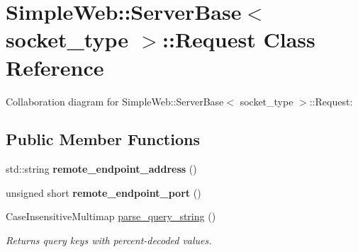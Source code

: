 \hypertarget{classSimpleWeb_1_1ServerBase_1_1Request}{}\section{Simple\+Web\+:\+:Server\+Base$<$ socket\+\_\+type $>$\+:\+:Request Class Reference}
\label{classSimpleWeb_1_1ServerBase_1_1Request}


Collaboration diagram for Simple\+Web\+:\+:Server\+Base$<$ socket\+\_\+type $>$\+:\+:Request\+:
\subsection*{Public Member Functions}
\begin{DoxyCompactItemize}
\item 
std\+::string {\bfseries remote\+\_\+endpoint\+\_\+address} ()\hypertarget{classSimpleWeb_1_1ServerBase_1_1Request_a0a6fbd6d33f7914fb1210505b4d49636}{}\label{classSimpleWeb_1_1ServerBase_1_1Request_a0a6fbd6d33f7914fb1210505b4d49636}

\item 
unsigned short {\bfseries remote\+\_\+endpoint\+\_\+port} ()\hypertarget{classSimpleWeb_1_1ServerBase_1_1Request_ae52197504bc13e987986b039b8343bf1}{}\label{classSimpleWeb_1_1ServerBase_1_1Request_ae52197504bc13e987986b039b8343bf1}

\item 
Case\+Insensitive\+Multimap \hyperlink{classSimpleWeb_1_1ServerBase_1_1Request_a164d86f876942bd99f6f15ba299e3040}{parse\+\_\+query\+\_\+string} ()\hypertarget{classSimpleWeb_1_1ServerBase_1_1Request_a164d86f876942bd99f6f15ba299e3040}{}\label{classSimpleWeb_1_1ServerBase_1_1Request_a164d86f876942bd99f6f15ba299e3040}

\begin{DoxyCompactList}\small\item\em Returns query keys with percent-\/decoded values. \end{DoxyCompactList}\end{DoxyCompactItemize}
